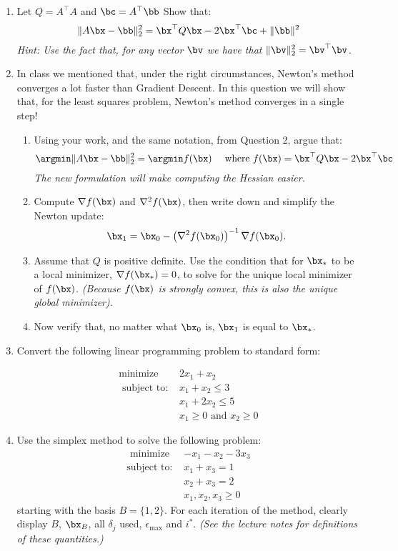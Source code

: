 \documentclass[10pt]{article}
\begin{document}
\begin{enumerate}
	\item Let $Q = A^{\top}A$ and $\bc = A^{\top}\bb$ Show that:
	$$
	\|A\bx - \bb\|_{2}^{2} = \bx^{\top}Q\bx - 2\bx^{\top}\bc + \|\bb\|^{2}
	$$
	{\em Hint: Use the fact that, for any vector $\bv$ we have that $\|\bv\|_{2}^{2} = \bv^{\top}\bv$.}
	\item In class we  mentioned that, under the right circumstances, Newton's method converges a lot faster than Gradient Descent. In this question we will show that, for the least squares problem, Newton's method converges in a single step! 
\begin{enumerate}
	\item Using your work, and the same notation, from Question 2, argue that:
		$$
		\argmin \|A\bx - \bb\|_{2}^{2} = \argmin f(\bx) \quad \text{ where } f(\bx) = \bx^{\top}Q\bx - 2\bx^{\top}\bc
		$$
		{\em The new formulation will make computing the Hessian easier.} \\
\item Compute $\nabla f(\bx)$ and $\nabla^{2}f(\bx)$, then write down and simplify the Newton update:
 $$
 \bx_1 = \bx_0  - \left(\nabla^{2}f(\bx_0)\right)^{-1}\nabla f(\bx_0).
 $$
 \item Assume that $Q$ is positive definite. Use the condition that for $\bx_{*}$ to be a local minimizer, $\nabla f(\bx_{*}) = 0$, to solve for the unique local minimizer of $f(\bx)$. {\em (Because $f(\bx)$ is strongly convex, this is also the unique global minimizer)}. \\
 
 \item Now verify that, no matter what $\bx_0$ is, $\bx_1$ is equal to $\bx_{*}$. \\

\end{enumerate}

\item Convert the following linear programming problem to standard form:

\begin{align*}
\text {minimize } & 2x_1 + x_2 \\
\text{ subject to: } & x_1 + x_2 \leq 3 \\
							  & x_1 + 2x_2 \leq 5 \\
							  & x_1 \geq 0 \text{ and } x_2 \geq 0
\end{align*}

\item Use the simplex method to solve the following problem:
\begin{align*}
	\text{ minimize } 	& -x_1 - x_2 - 3x_3 \\	
	\text {subject to: }  & x_1 +x_3 = 1 \\
							    	& x_2 + x_3 = 2 \\
							    	& x_1,x_2,x_3 \geq 0
\end{align*}
starting with the basis $B = \{1,2\}$. For each iteration of the method, clearly display $B$, $\bx_{B}$, all $\delta_{j}$ used, $\epsilon_{\max}$ and $i^{*}$. {\em (See the lecture notes for definitions of these quantities.)}

\end{enumerate}
\end{document}

